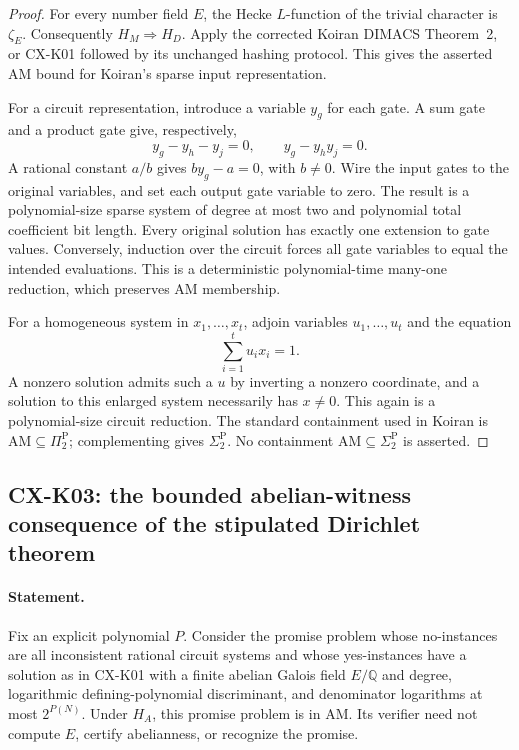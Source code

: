 \documentclass[11pt,a4paper]{article}
\begin{document}
\begin{proof}
For every number field $E$, the Hecke $L$-function of the trivial
character is $\zeta_E$. Consequently $H_M\Rightarrow H_D$.
Apply the corrected Koiran DIMACS Theorem~2, or CX-K01 followed by its
unchanged hashing protocol. This gives the asserted AM bound for
Koiran's sparse input representation.

For a circuit representation, introduce a variable $y_g$ for each
gate. A sum gate and a product gate give, respectively,
\[
 y_g-y_h-y_j=0,\qquad y_g-y_hy_j=0.
\]
A rational constant $a/b$ gives $by_g-a=0$, with $b\ne0$.
Wire the input gates to the original variables, and set each output
gate variable to zero. The result is a polynomial-size sparse system
of degree at most two and polynomial total coefficient bit length.
Every original solution has exactly one extension to gate values.
Conversely, induction over the circuit forces all gate variables to
equal the intended evaluations. This is a deterministic
polynomial-time many-one reduction, which preserves AM membership.

For a homogeneous system in $x_1,\ldots,x_t$, adjoin variables
$u_1,\ldots,u_t$ and the equation
\[
 \sum_{i=1}^t u_i x_i=1.
\]
A nonzero solution admits such a $u$ by inverting a nonzero coordinate,
and a solution to this enlarged system necessarily has $x\ne0$.
This again is a polynomial-size circuit reduction. The standard
containment used in Koiran is $\mathrm{AM}\subseteq\Pi_2^{\mathrm P}$;
complementing gives $\Sigma_2^{\mathrm P}$. No containment
$\mathrm{AM}\subseteq\Sigma_2^{\mathrm P}$ is asserted.
\end{proof}

\subsection{CX-K03: the bounded abelian-witness consequence of the stipulated Dirichlet theorem}
\label{cx:k03}

\paragraph{Statement.}
Fix an explicit polynomial $P$. Consider the promise problem whose
no-instances are all inconsistent rational circuit systems and whose
yes-instances have a solution as in CX-K01 with a finite abelian
Galois field $E/\mathbb Q$ and degree, logarithmic defining-polynomial
discriminant, and denominator logarithms at most $2^{P(N)}$.
Under $H_A$, this promise problem is in AM. Its verifier need not
compute $E$, certify abelianness, or recognize the promise.
\end{document}
